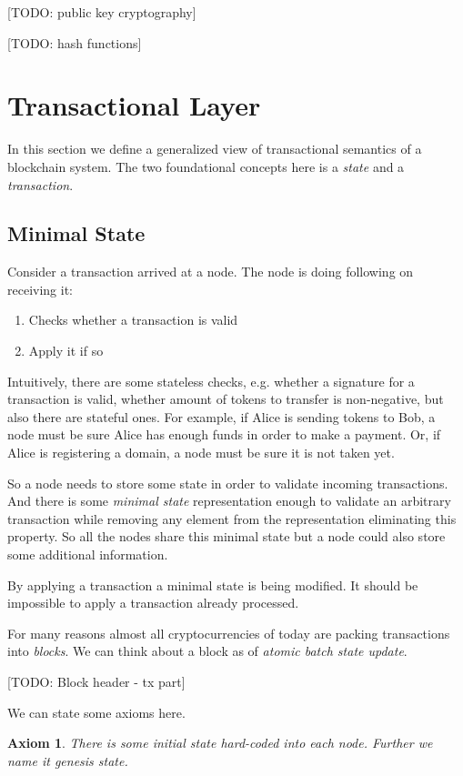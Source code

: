 \documentclass[]{report}   %
\newtheorem{axiom}{Axiom}
\begin{document}
[TODO: public key cryptography]

[TODO: hash functions]


\section{Transactional Layer}

In this section we define a generalized view of transactional semantics of a blockchain system. The two foundational concepts here is a \textit{state} and a \textit{transaction}.

\subsection{Minimal State}     %
	Consider a transaction arrived at a node. The node is doing following on receiving it:

    \begin{enumerate}
		\item Checks whether a transaction is valid
		\item Apply it if so
    \end{enumerate}

	Intuitively, there are some stateless checks, e.g. whether a signature for a transaction is valid, whether amount of tokens to transfer is non-negative, but also there are stateful ones. For example, if Alice is sending tokens to Bob, a node must be sure Alice has enough funds in order to make a payment. Or, if Alice is registering a domain, a node must be sure it is not taken yet. 

	So a node needs to store some state in order to validate incoming transactions. And there is some \textit{minimal state} representation enough to validate an arbitrary transaction while removing any element from the representation eliminating this property. So all the nodes share this minimal state but a node could also store some additional information. 

	By applying a transaction a minimal state is being modified. It should be impossible to apply a transaction already processed. 

	For many reasons almost all cryptocurrencies of today are packing transactions into \textit{blocks}. We can think about a block as of \textit{atomic batch state update}. 

    [TODO: Block header - tx part]


	We can state some axioms here.

	\begin{axiom}
	 There is some initial state hard-coded into each node. Further we name it \textit{genesis state}.
	\end{axiom}
\end{document}
